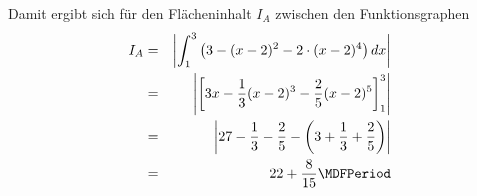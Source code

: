 \begin{MExercises}
\begin{MExercise}
\begin{MHint}{\iSolution}
Damit ergibt sich für den Flächeninhalt $I_A$ zwischen den Funktionsgraphen
\begin{eqnarray*}
I_A & = & \left|\int_1^3 \left(3 - (x - 2)^2 - 2 \cdot (x - 2)^4\right) \MD x \right| \\
 & = & \left|\left[ 3 x - \frac{1}{3} (x - 2)^3 - \frac{2}{5} (x - 2)^5 \right]_{1}^{3} \right| \\
 & = & \left| 27 - \frac{1}{3} - \frac{2}{5} %
      - \left(3 + \frac{1}{3} + \frac{2}{5}\right) \right| \\
 & = & 22 + \frac{8}{15} \MDFPeriod %
\end{eqnarray*}
\end{MHint}
\end{MExercise}

%
%

\end{MExercises}
